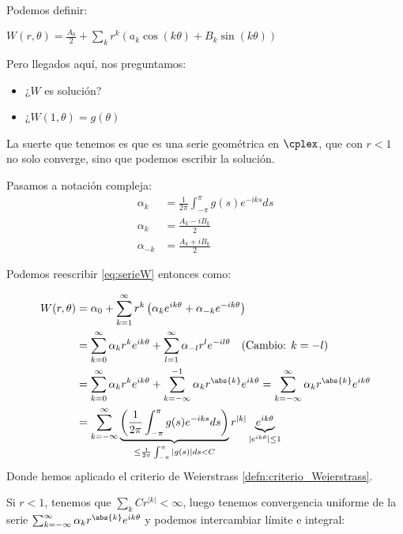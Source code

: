 		Podemos definir:

		\( W(r,\theta) = \frac{A_0}{2} + \sum_k r^k(a_k \cos(k \theta) + B_k \sin(k\theta)) \label{eq:serieW} \)

		Pero llegados aquí, nos preguntamos:

		\begin{itemize}
			\item ¿$W$ es solución?
			\item ¿$W(1, \theta) = g(\theta)$
		\end{itemize}


		La suerte que tenemos es que es una serie geométrica en $\cplex$, que con $r<1$ no solo converge, sino que podemos escribir la solución.

		Pasamos a notación compleja:
		\begin{align*}
			\alpha_k &= \frac{1}{2\pi} \int_{-\pi}^{\pi} g(s) e^{-iks} ds \\
			\alpha_k &= \frac{A_k - iB_k}{2} \\
			\alpha_{-k} &= \frac{A_k + iB_k}{2}
		\end{align*}

		Podemos reescribir \eqref{eq:serieW} entonces como:

		\begin{align*}
		W(r, \theta) &= \alpha_0 + \sum_{k=1}^{\infty} r^k \left( \alpha_k e^{ik\theta} + \alpha_{-k} e^{-ik\theta} \right)\\
%
		&= \sum_{k=0}^{\infty} \alpha_k r^k e^{ik\theta} + \sum_{l=1}^{\infty} \alpha_{-l} r^l e^{-il\theta} \quad (\text{Cambio: } k = -l)\\
%
		&= \sum_{k=0}^{\infty} \alpha_k r^k e^{ik\theta} + \sum_{k=-\infty}^{-1} \alpha_{k} r^{\abs{k}} e^{ik\theta} = \sum_{k=-\infty}^{\infty} \alpha_{k} r^{\abs{k}} e^{ik\theta}\\
%
		&= \sum_{k=-\infty}^{\infty} \underbrace{\left( \frac{1}{2\pi} \int_{-\pi}^{\pi} g(s) e^{-iks} ds \right)}_{\leq \frac{1}{2\pi} \int_{-\pi}^{\pi} |g(s)| ds < C} r ^{|k|} \underbrace{e^{ik\theta}}_{|e^{ik\theta}| \leq 1}\\
		\end{align*}
		Donde hemos aplicado el criterio de Weierstrass \ref{defn:criterio_Weierstrass}.

		Si $r < 1$, tenemos que $\sum_k Cr^{|k|} < \infty$, luego tenemos convergencia uniforme de la serie $\sum_{k=-\infty}^{\infty} \alpha_{k} r^{\abs{k}} e^{ik\theta}$ y podemos intercambiar límite e integral:

